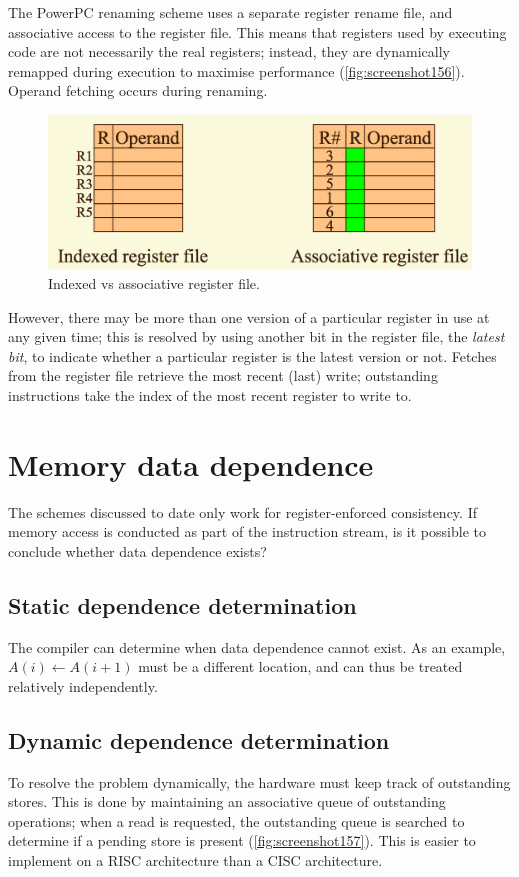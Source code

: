 The PowerPC renaming scheme uses a separate register rename file, and associative access to the register file. This means that registers used by executing code are not necessarily the real registers; instead, they are dynamically remapped during execution to maximise performance (\autoref{fig:screenshot156}). Operand fetching occurs during renaming. 

\begin{figure}
\centering
\includegraphics[width=0.7\linewidth]{screenshot156}
\caption{Indexed vs associative register file.}
\label{fig:screenshot156}
\end{figure}

However, there may be more than one version of a particular register in use at any given time; this is resolved by using another bit in the register file, the \textit{latest bit}, to indicate whether a particular register is the latest version or not. Fetches from the register file retrieve the most recent (last) write; outstanding instructions take the index of the most recent register to write to.

\section{Memory data dependence}
The schemes discussed to date only work for register-enforced consistency. If memory access is conducted as part of the instruction stream, is it possible to conclude whether data dependence exists?

\subsection{Static dependence determination}
The compiler can determine when data dependence cannot exist. As an example, $A(i) \gets A(i+1)$ must be a different location, and can thus be treated relatively independently.

\subsection{Dynamic dependence determination}
To resolve the problem dynamically, the hardware must keep track of outstanding stores. This is done by maintaining an associative queue of outstanding operations; when a read is requested, the outstanding queue is searched to determine if a pending store is present (\autoref{fig:screenshot157}). This is easier to implement on a RISC architecture than a CISC architecture.

